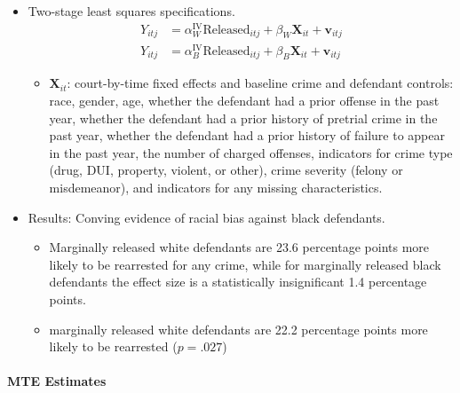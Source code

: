 \documentclass[../root]{subfiles}
\begin{document}
    \begin{itemize}
      \item Two-stage least squares specifications.
      \begin{align*}
        Y_{itj} &= \alpha_W^{\text{IV}}\text{Released}_{itj} + \beta_W \mathbf{X}_{it} + \mathbf{v}_{itj} \\
        Y_{itj} &= \alpha_B^{\text{IV}}\text{Released}_{itj} + \beta_B \mathbf{X}_{it} + \mathbf{v}_{itj}
      \end{align*}
      \begin{itemize}
        \item $\mathbf{X}_{it}$: court-by-time fixed effects and baseline crime and defendant controls: race, gender, age, whether the defendant had a prior offense in the past year, whether the defendant had a prior history of pretrial crime in the past year, whether the defendant had a prior history of failure to appear in the past year, the number of charged offenses, indicators for crime type (drug, DUI, property, violent, or other), crime severity (felony or misdemeanor), and indicators for any missing characteristics.
      \end{itemize}
      \item Results: Conving evidence of racial bias against black defendants.
      \begin{itemize}
        \item Marginally released white defendants are 23.6 percentage points more likely to be rearrested for any crime, while for marginally released black defendants the effect size is a statistically insignificant 1.4 percentage points.
        \item marginally released white defendants are 22.2 percentage points more likely to be rearrested ($p = .027$)
      \end{itemize}
    \end{itemize}


    \paragraph{MTE Estimates}
\end{document}
